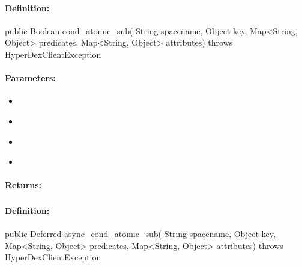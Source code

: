 \paragraph{Definition:}
\begin{javacode}
public Boolean cond_atomic_sub(
        String spacename,
        Object key,
        Map<String, Object> predicates,
        Map<String, Object> attributes) throws HyperDexClientException
\end{javacode}

\paragraph{Parameters:}
\begin{itemize}[noitemsep]
\item {}\\

\item {}\\

\item {}\\

\item {}\\

\end{itemize}

\paragraph{Returns:}


\pagebreak
\subsubsection{}
\label{api:java:async_cond_atomic_sub}


\paragraph{Definition:}
\begin{javacode}
public Deferred async_cond_atomic_sub(
        String spacename,
        Object key,
        Map<String, Object> predicates,
        Map<String, Object> attributes) throws HyperDexClientException
\end{javacode}

